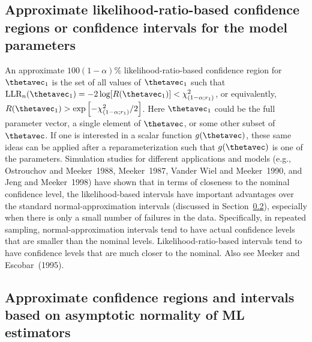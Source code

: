 \subsection{Approximate likelihood-ratio-based confidence regions
or confidence intervals for
the model parameters}
\label{section:like.con.regions}

An approximate $100(1-\alpha)\%$ likelihood-ratio-based confidence
region for $\thetavec_{1}$ is the set of all values of
$\thetavec_{1}$ such that $\mbox{LLR}_{n}(\thetavec_{1}) = -2
\log[R(\thetavec_{1})] < \chi^{2}_{(1-\alpha;r_{1})}$, or
equivalently, $R(\thetavec _{1}) >
\exp \left [-\chi^{2}_{(1-\alpha;r_{1})}/2 \right ]$.
Here $\thetavec _{1}$ could be the full parameter vector, a single
element of $\thetavec$, or some other subset of $\thetavec$.  If one
is interested in a scalar function $g(\thetavec)$, these same ideas
can be applied after a reparameterization such that $g(\thetavec)$
is one of the parameters.  Simulation studies for different
applications and models (e.g., Ostrouchov and Meeker~1988,
Meeker~1987, Vander Wiel and Meeker~1990, and Jeng and Meeker~1998)
have shown that in terms of closeness to the nominal confidence
level, the likelihood-based intervals have important advantages over
the standard normal-approximation intervals (discussed in
Section~\ref{asection:ci.wald}), especially when there is only a
small number of failures in the data.  Specifically, in repeated
sampling, normal-approximation intervals tend to have actual
confidence levels that are smaller than the nominal levels.
Likelihood-ratio-based intervals tend to have confidence levels that
are much closer to the nominal.  Also see Meeker and Escobar~(1995).


\subsection{Approximate confidence regions and intervals based on asymptotic
normality of ML estimators}

\label{asection:ci.wald}


